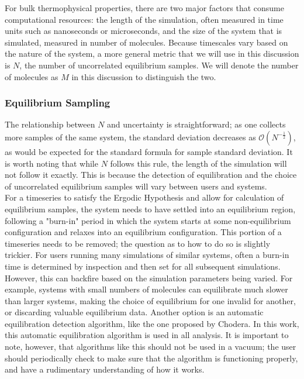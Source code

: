 \documentclass[aps,pre,twocolumn,nofootinbib,superscriptaddress,linenumbers,10pt, draft,tightenlines]{revtex4-1}
\begin{document}
For bulk thermophysical properties, there are two major factors that consume computational resources: the length of the simulation, often measured in time units such as nanoseconds or microseconds, and the size of the system that is simulated, measured in number of molecules.  Because timescales vary based on the nature of the system, a more general metric that we will use in this discussion is $N$, the number of uncorrelated equilibrium samples. We will denote the number of molecules as $M$ in this discussion to distinguish the two.
\subsubsection{Equilibrium Sampling}
The relationship between $N$ and uncertainty is straightforward; as one collects more samples of the same system, the standard deviation decreases as $\mathcal{O} (N^{-\frac{1}{2}})$, as would be expected for the standard formula for sample standard deviation.  It is worth noting that while $N$ follows this rule, the length of the simulation will not follow it exactly.  This is because the detection of equilibration and the choice of uncorrelated equilibrium samples will vary between users and systems.  
\\
For a timeseries to satisfy the Ergodic Hypothesis and allow for calculation of equilibrium samples, the system needs to have settled into an equilibrium region, following a "burn-in" period in which the system starts at some non-equilibrium configuration and relaxes into an equilibrium configuration.  This portion of a timeseries needs to be removed; the question as to how to do so is slightly trickier.  For users running many simulations of similar systems, often a burn-in time is determined by inspection and then set for all subsequent simulations. However, this can backfire based on the simulation parameters being varied.  For example, systems with small numbers of molecules can equilibrate much slower than larger systems, making the choice of equilibrium for one invalid for another, or discarding valuable equilibrium data.  Another option is an automatic equilibration detection algorithm, like the one proposed by Chodera. %
In this work, this automatic equilibration algorithm is used in all analysis.  It is important to note, however, that algorithms like this should not be used in a vacuum;  the user should periodically check to make sure that the algorithm is functioning properly, and have a rudimentary understanding of how it works.
\end{document}
